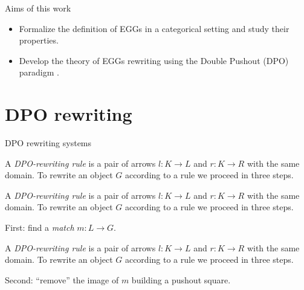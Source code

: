 \documentclass[aspectratio=169]{beamer}
\begin{document}
\begin{frame}{Aims of this work} 
    \begin{itemize}
        \item Formalize the definition of EGGs in a categorical setting and study their properties. \pause \medskip 
        \item Develop the theory of EGGs rewriting using the Double Pushout (DPO) paradigm \cite{ehrig2006fundamentals,ehrig1999handbook}.
    \end{itemize}
\end{frame}

\section{DPO rewriting}

\begin{frame}{DPO rewriting systems} 
	\begin{overprint}

		
		A \emph{DPO-rewriting rule} is a pair of arrows $l:K\to L$ and $r:K\to R$ with the same domain. To rewrite an object $G$ according to a rule we proceed in three steps.
		
		
	A \emph{DPO-rewriting rule} is a pair  of arrows $l:K\to L$ and $r:K\to R$ with the same domain. To rewrite an object $G$ according to a rule we proceed in three steps.
		
		\medskip
		First: find a \emph{match} $m:L\to G$.
		\begin{center}
		\end{center}
		
		
		
		A \emph{DPO-rewriting rule} is a pair  of arrows $l:K\to L$ and $r:K\to R$ with the same domain. To rewrite an object $G$ according to a rule we proceed in three steps.		
		
		\medskip
		Second: ``remove'' the image of $m$  building a pushout square. \vspace{-0.075cm}
		\begin{center}
		\end{center}		
		

\end{overprint}
\end{frame}
\end{document}
